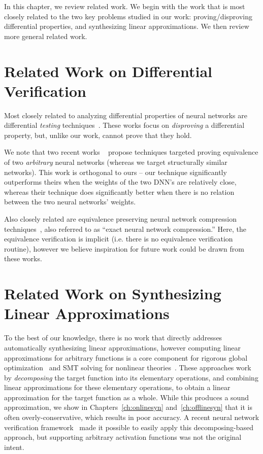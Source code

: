 In this chapter, we review related work. We begin with the work that is most
closely related to the two key problems studied in our work: proving/disproving
differential properties, and synthesizing linear approximations. We then review
more general related work.

\section{Related Work on Differential Verification}
Most closely related to analyzing differential properties of neural networks are
differential \textit{testing} techniques~\cite{xie2019diffchaser, PeiCYJ17,
MaLLZG18, asyrofi2021can}. These works focus on \textit{disproving} a differential
property, but, unlike our work, cannot prove that they hold.

We note that two recent works ~\cite{teuber2021geometric,kleine2020verifying}
propose techniques targeted proving equivalence of two \textit{arbitrary} neural
networks (whereas we target structurally similar networks). This work is
orthogonal to ours -- our technique significantly outperforms theirs when the
weights of the two DNN's are relatively close, whereas their technique does
significantly better when there is no relation between the two neural networks'
weights.

Also closely related are equivalence preserving neural network compression
techniques~\cite{lahav2021pruning,serra2021scaling}, also referred to as ``exact
neural network compression.'' Here, the equivalence verification is implicit (i.e.
there is no equivalence verification routine), however we believe inspiration for
future work could be drawn from these works.


\section{Related Work on Synthesizing Linear Approximations}
To the best of our knowledge, there is no work that directly addresses
automatically synthesizing linear approximations, however computing linear
approximations for arbitrary functions is a core component for rigorous global
optimization~\cite{ibex} and SMT solving for nonlinear
theories~\cite{gao2013dreal}. These approaches work by \textit{decomposing} the
target function into its elementary operations, and combining linear
approximations for these elementary operations, to obtain a linear approximation
for the target function as a whole. While this produces a sound approximation, we
show in Chapters~\ref{ch:onlinesyn} and~\ref{ch:offlinesyn} that it is often
overly-conservative, which results in poor accuracy. A recent neural network
verification framework~\cite{autolipra} made it possible to easily apply this
decomposing-based approach, but supporting arbitrary activation functions was not
the original intent.

